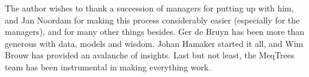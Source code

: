 \documentclass[]{aa}
\begin{document}
\begin{acknowledgements}

The author wishes to thank a succession of managers for putting up with him, and Jan Noordam for making this process considerably easier (especially for the managers), and for many other things besides. Ger de Bruyn has been more than generous with data, models and wisdom. Johan Hamaker started it all, and Wim Brouw has provided an avalanche of insights. Last but not least, the MeqTrees team has been instrumental in making everything work.

\end{acknowledgements}




\end{document}
